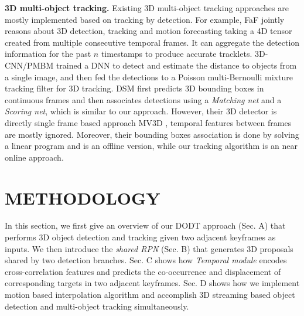 \documentclass[a4paper, 10pt, conference]{ieeeconf}      %
\begin{document}

\textbf{3D multi-object tracking.} Existing 3D multi-object tracking approaches are mostly implemented based on tracking by detection. For example, FaF \cite{luo2018fast} jointly reasons about 3D detection, tracking and motion forecasting taking a 4D tensor created from multiple consecutive temporal frames. It can aggregate the detection information for the past $n$ timestamps to produce accurate tracklets. 3D-CNN/PMBM \cite{scheidegger2018mono} trained a DNN to detect and estimate the distance to objects from a single image, and then fed the detections to a Poisson multi-Bernoulli mixture tracking filter for 3D tracking. DSM \cite{frossard2018end} first predicts 3D bounding boxes in continuous frames and then associates detections using a \textit{Matching net} and a \textit{Scoring net}, which is similar to our approach. However, their 3D detector is directly single frame based approach MV3D \cite{chen2017multi}, temporal features between frames are mostly ignored. Moreover, their bounding boxes association is done by solving a linear program and is an offline version, while our tracking algorithm is an near online approach.


\section{METHODOLOGY}

In this section, we first give an overview of our DODT approach (Sec. A) that performs 3D object detection and tracking given two adjacent keyframes as inputs. We then introduce the \textit{shared RPN} (Sec. B) that generates 3D proposals shared by two detection branches. Sec. C shows how \textit{Temporal module} encodes cross-correlation features and predicts the co-occurrence and displacement of corresponding targets in two adjacent keyframes. Sec. D shows how we implement motion based interpolation algorithm and accomplish 3D streaming based object detection and multi-object tracking simultaneously.
\end{document}
